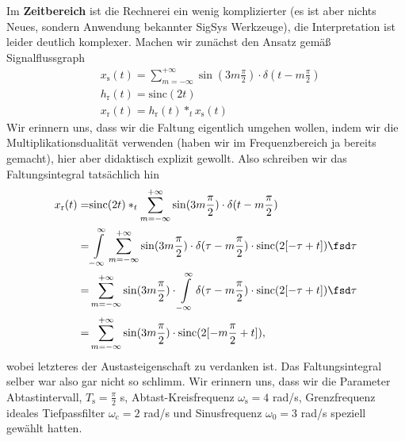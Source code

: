 \begin{Loesung}
Im \textbf{Zeitbereich} ist die Rechnerei ein wenig komplizierter (es ist aber
nichts Neues, sondern Anwendung bekannter SigSys Werkzeuge), die Interpretation
ist leider deutlich komplexer.
Machen wir zunächst den Ansatz gemäß Signalflussgraph
\begin{align}
&x_\mathrm{s}(t) =
\sum_{m=-\infty}^{+\infty} \sin(3 m \frac{\pi}{2}) \cdot \delta(t-m \frac{\pi}{2})\\
&h_\mathrm{r}(t) = \mathrm{sinc}(2 t)\\
&x_\mathrm{r}(t) = h_\mathrm{r}(t) \ast_t x_\mathrm{s}(t)
\end{align}
Wir erinnern uns, dass wir die Faltung eigentlich umgehen wollen, indem
wir die Multiplikationsdualität verwenden (haben wir im Frequenzbereich
ja bereits gemacht), hier aber didaktisch explizit gewollt.
Also schreiben wir das Faltungsintegral tatsächlich hin
\begin{align}
x_\mathrm{r}(t) =&
\mathrm{sinc}(2 t)
\ast_t
\sum_{m=-\infty}^{+\infty} \sin(3 m \frac{\pi}{2}) \cdot \delta(t-m \frac{\pi}{2})\\
=&
\int\limits_{-\infty}^{\infty}
\sum_{m=-\infty}^{+\infty} \sin(3 m \frac{\pi}{2}) \cdot \delta(\tau-m \frac{\pi}{2})
\cdot \mathrm{sinc}(2 [-\tau + t]) \fsd \tau\\
=&
\sum_{m=-\infty}^{+\infty} \sin(3 m \frac{\pi}{2}) \cdot
\int\limits_{-\infty}^{\infty} \delta(\tau-m \frac{\pi}{2})
\cdot \mathrm{sinc}(2 [-\tau + t]) \fsd \tau\\
=&
\sum_{m=-\infty}^{+\infty} \sin(3 m \frac{\pi}{2}) \cdot \mathrm{sinc}(2 [-m \frac{\pi}{2} + t]),
\label{eq:EF235EE3D8_SincSpecialResult}
\end{align}
wobei letzteres der Austasteigenschaft zu verdanken ist. Das Faltungsintegral selber
war also gar nicht so schlimm.
%
Wir erinnern uns, dass wir die Parameter Abtastintervall, $T_\mathrm{s}=\frac{\pi}{2}$ s,
Abtast-Kreisfrequenz $\omega_\mathrm{s}=4$  rad/s, Grenzfrequenz ideales
Tiefpassfilter $\omega_\mathrm{c} = 2$ rad/s und Sinusfrequenz $\omega_0=3$ rad/s
speziell gewählt hatten.
\end{Loesung}
%
%

